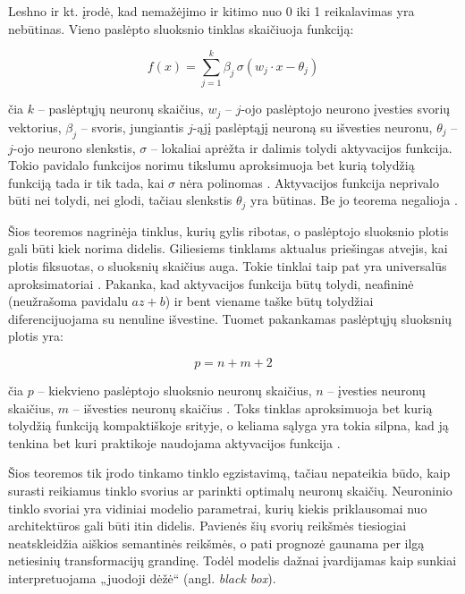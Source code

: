 Leshno ir kt. \cite{leshno1993} įrodė, kad nemažėjimo ir kitimo nuo 0 iki 1 reikalavimas yra nebūtinas.
Vieno paslėpto sluoksnio tinklas skaičiuoja funkciją:

\begin{equation}
    f(x) = \sum_{j=1}^{k} \beta_j \, \sigma(w_j \cdot x - \theta_j)
    \label{eq:leshno}
\end{equation}

čia $k$ -- paslėptųjų neuronų skaičius, $w_j$ -- $j$-ojo paslėptojo neurono įvesties svorių vektorius, $\beta_j$ -- svoris, jungiantis $j$-ąjį paslėptąjį neuroną su išvesties neuronu, $\theta_j$ -- $j$-ojo neurono slenkstis, $\sigma$ -- lokaliai aprėžta ir dalimis tolydi aktyvacijos funkcija.
Tokio pavidalo funkcijos norimu tikslumu aproksimuoja bet kurią tolydžią funkciją tada ir tik tada, kai $\sigma$ nėra polinomas \cite{leshno1993}.
Aktyvacijos funkcija neprivalo būti nei tolydi, nei glodi, tačiau slenkstis $\theta_j$ yra būtinas.
Be jo teorema negalioja \cite{leshno1993}.

Šios teoremos nagrinėja tinklus, kurių gylis ribotas, o paslėptojo sluoksnio plotis gali būti kiek norima didelis.
Giliesiems tinklams aktualus priešingas atvejis, kai plotis fiksuotas, o sluoksnių skaičius auga.
Tokie tinklai taip pat yra universalūs aproksimatoriai \cite{kidger2020}.
Pakanka, kad aktyvacijos funkcija būtų tolydi, neafininė (neužrašoma pavidalu $az + b$) ir bent viename taške būtų tolydžiai diferencijuojama su nenuline išvestine.
Tuomet pakankamas paslėptųjų sluoksnių plotis yra:

\begin{equation}
    p = n + m + 2
    \label{eq:kidger-plotis}
\end{equation}

čia $p$ -- kiekvieno paslėptojo sluoksnio neuronų skaičius, $n$ -- įvesties neuronų skaičius, $m$ -- išvesties neuronų skaičius \cite{kidger2020}.
Toks tinklas aproksimuoja bet kurią tolydžią funkciją kompaktiškoje srityje, o keliama sąlyga yra tokia silpna, kad ją tenkina bet kuri praktikoje naudojama aktyvacijos funkcija \cite{kidger2020}.

Šios teoremos tik įrodo tinkamo tinklo egzistavimą, tačiau nepateikia būdo, kaip surasti reikiamus tinklo svorius ar parinkti optimalų neuronų skaičių.
Neuroninio tinklo svoriai yra vidiniai modelio parametrai, kurių kiekis priklausomai nuo architektūros gali būti itin didelis.
Pavienės šių svorių reikšmės tiesiogiai neatskleidžia aiškios semantinės reikšmės, o pati prognozė gaunama per ilgą netiesinių transformacijų grandinę.
Todėl modelis dažnai įvardijamas kaip sunkiai interpretuojama „juodoji dėžė“ (angl. \textit{black box}).

